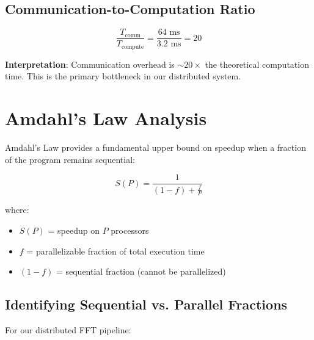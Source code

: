 \documentclass[11pt,a4paper]{article}
\begin{document}
\subsection{Communication-to-Computation Ratio}

\[
\frac{T_{\text{comm}}}{T_{\text{compute}}} = \frac{64 \text{ ms}}{3.2 \text{ ms}} = 20
\]

\textbf{Interpretation}: Communication overhead is $\sim 20\times$ the theoretical computation time. This is the primary bottleneck in our distributed system.

\section{Amdahl's Law Analysis}

Amdahl's Law provides a fundamental upper bound on speedup when a fraction of the program remains sequential:

\[
S(P) = \frac{1}{(1-f) + \frac{f}{P}}
\]

where:
\begin{itemize}
    \item $S(P)$ = speedup on $P$ processors
    \item $f$ = parallelizable fraction of total execution time
    \item $(1-f)$ = sequential fraction (cannot be parallelized)
\end{itemize}

\subsection{Identifying Sequential vs. Parallel Fractions}

For our distributed FFT pipeline:
\end{document}
